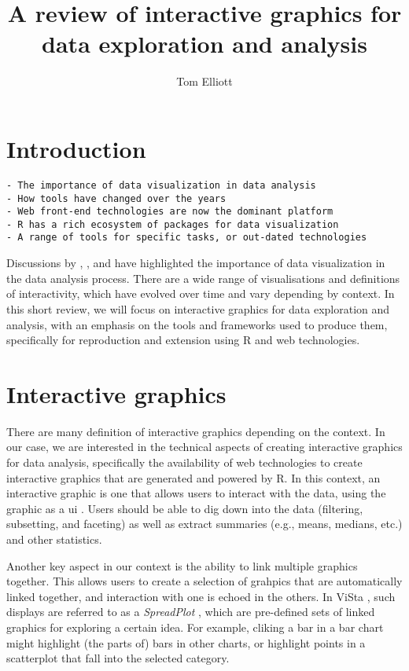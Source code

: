 \documentclass{article}
\title{A review of interactive graphics for data exploration and analysis}
\author{Tom Elliott}
\affil{iNZight Analytics Ltd}
\affil{University of Auckland}
\date{}
\newcommand{\prog}[1]{{\sf #1}}
\newcommand{\proglang}[1]{\prog{#1}}
\newcommand{\R}{\prog{R}}
\begin{document}
\maketitle

\begin{abstract}

\end{abstract}

\section{Introduction}
\label{sec:intro}

\begin{verbatim}
- The importance of data visualization in data analysis
- How tools have changed over the years
- Web front-end technologies are now the dominant platform
- R has a rich ecosystem of packages for data visualization
- A range of tools for specific tasks, or out-dated technologies
\end{verbatim}

Discussions by \cite{Cook2007}, \cite{Theus2014}, and \cite{Ward2015} have highlighted the importance of data visualization in the data analysis process.
There are a wide range of visualisations and definitions of interactivity, which have evolved over time and vary depending by context.
In this short review, we will focus on interactive graphics for data exploration and analysis, with an emphasis on the tools and frameworks used to produce them, specifically for reproduction and extension using \R{} and web technologies.

\section{Interactive graphics}
\label{sec:interactive-graphics}

There are many definition of interactive graphics depending on the context.
In our case, we are interested in the technical aspects of creating interactive graphics for data analysis,
specifically the availability of web technologies to create interactive graphics that are generated and powered by \R{}.
In this context, an interactive graphic is one that allows users to interact with the data, using the graphic as a \gls{ui} \parencite{Young2011}.
Users should be able to dig down into the data (filtering, subsetting, and faceting) as well as extract summaries (e.g., means, medians, etc.) and other statistics.

Another key aspect in our context is the ability to link multiple graphics together.
This allows users to create a selection of grahpics that are automatically linked together, and interaction with one is echoed in the others.
In \proglang{ViSta} \parencite{Young1996}, such displays are referred to as a \emph{SpreadPlot} \parencite{Young2003}, which are pre-defined sets of linked graphics for exploring a certain idea.
For example, cliking a bar in a bar chart might highlight (the parts of) bars in other charts, or highlight points in a scatterplot that fall into the selected category.
\end{document}
